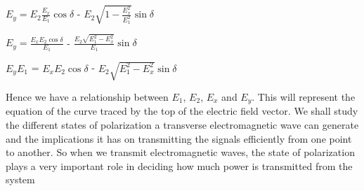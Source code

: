 $E_y = E_{2}\frac{E_x}{E_{1}}\cos\delta$ - $E_{2}\sqrt{1 - \frac{E_x^2}{E_{1}^2}}\sin\delta$

$E_y = \frac{E_xE_{2}\cos\delta}{E_{1}}$ - $\frac{E_{2}\sqrt{E_{1}^2 - E_x^2}}{E_{1}}\sin\delta$

$E_yE_{1}$ = $E_xE_{2}\cos\delta$ - $E_{2}\sqrt{E_{1}^2 - E_x^2}\sin\delta$

Hence we have a relationship between $E_{1}$, $E_{2}$, $E_x$ and $E_y$. This will represent the equation of the curve traced by the top of the electric field vector. We shall study the different states of polarization a transverse electromagnetic wave can generate and the implications it has on transmitting the signals efficiently from one point to another. So when we transmit electromagnetic waves, the state of polarization plays a very important role in deciding how much power is transmitted from the system	
